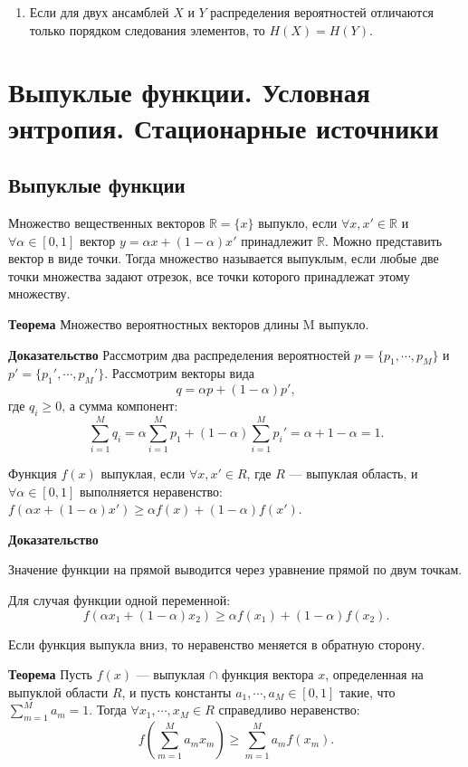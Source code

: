 \begin{enumerate}
     \item Если для двух ансамблей $X$ и $Y$ распределения вероятностей
         отличаются только порядком следования элементов, то $H(X) = H(Y)$.
\end{enumerate}

\section{Выпуклые функции. Условная энтропия. Стационарные источники}

\subsection{Выпуклые функции}

Множество вещественных векторов $\mathbb{R} = \{ x \}$ выпукло, если $\forall
x, x' \in \mathbb{R}$ и $\forall \alpha \in [ 0, 1 ]$ вектор $y = \alpha x +
(1 - \alpha)x'$ принадлежит $\mathbb{R}$. Можно представить вектор в виде
точки. Тогда множество называется выпуклым, если любые две точки множества
задают отрезок, все точки которого принадлежат этому множеству.

\textbf{Теорема} Множество вероятностных векторов длины M выпукло.

\textbf{Доказательство} Рассмотрим два распределения вероятностей $p = \{p_1,
\cdots, p_M\}$ и $p' = \{p_1', \cdots, p_M'\}$. Рассмотрим векторы вида
\[
    q = \alpha p + (1 - \alpha)p',
\]
где $q_i \geq 0$, а сумма компонент:
\[
    \sum_{i=1}^M q_i = \alpha \sum_{i=1}^M p_1 + (1 - \alpha) \sum_{i=1}^M p_i'
    = \alpha + 1 - \alpha = 1.
\]

Функция $f(x)$ выпуклая, если $\forall x, x' \in R$, где $R$ --- выпуклая
область, и $\forall \alpha \in [0, 1]$ выполняется неравенство: $f(\alpha x +
(1 - \alpha) x') \geq \alpha f(x) + (1 - \alpha) f(x')$.

\textbf{Доказательство}


Значение функции на прямой выводится через уравнение прямой по двум точкам.

Для случая функции одной переменной:
\[
    f(\alpha x_1 + (1 - \alpha) x_2) \geq \alpha f(x_1) + (1 - \alpha) f(x_2).
\]

Если функция выпукла вниз, то неравенство меняется в обратную сторону.

\textbf{Теорема} Пусть $f(x)$ --- выпуклая $\cap$ функция вектора $x$,
определенная на выпуклой области $R$, и пусть константы $a_1, \cdots, a_M \in
[0, 1]$ такие, что $\sum_{m=1}^M a_m = 1$. Тогда $\forall x_1, \cdots, x_M \in
R$ справедливо неравенство:
\[
    f \left( \sum_{m=1}^M a_m x_m \right) \geq \sum_{m=1}^M a_m f(x_m).
\]


